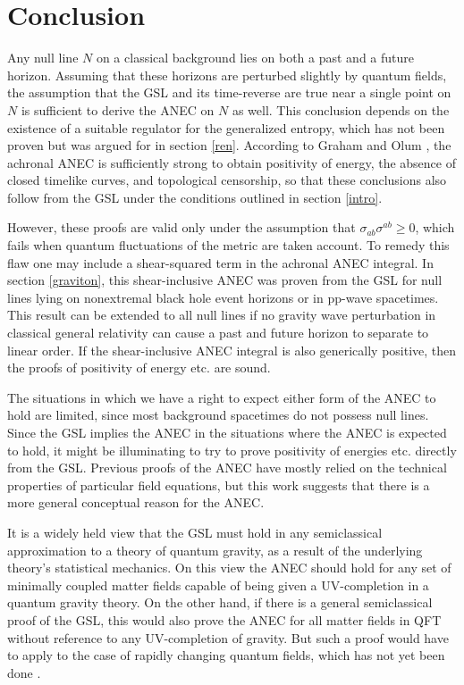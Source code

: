 \documentclass{article}
\begin{document}
\section{Conclusion}\label{con}

Any null line $N$ on a classical background lies on both a past and a future horizon.  Assuming that these horizons are perturbed slightly by quantum fields, the assumption that the GSL and its time-reverse are true near a single point on $N$ is sufficient to derive the ANEC on $N$ as well.  This conclusion depends on the existence of a suitable regulator for the generalized entropy, which has not been proven but was argued for in section \ref{ren}.  According to Graham and Olum \cite{GO07}, the achronal ANEC is sufficiently strong to obtain positivity of energy, the absence of closed timelike curves, and topological censorship, so that these conclusions also follow from the GSL under the conditions outlined in section \ref{intro}. 

However, these proofs are valid only under the assumption that $\sigma_{ab}\sigma^{ab} \ge 0$, which fails when quantum fluctuations of the metric are taken account.  To remedy this flaw one may include a shear-squared term in the achronal ANEC integral.  In section \ref{graviton}, this shear-inclusive ANEC was proven from the GSL for null lines lying on nonextremal black hole event horizons or in pp-wave spacetimes.  This result can be extended to all null lines if no gravity wave perturbation in classical general relativity can cause a past and future horizon to separate to linear order.  If the shear-inclusive ANEC integral is also generically positive, then the proofs of positivity of energy etc. are sound.

The situations in which we have a right to expect either form of the ANEC to hold are limited, since most background spacetimes do not possess null lines.  Since the GSL implies the ANEC in the situations where the ANEC is expected to hold, it might be illuminating to try to prove positivity of energies etc. directly from the GSL.  Previous proofs of the ANEC have mostly relied on the technical properties of particular field equations, but this work suggests that there is a more general conceptual reason for the ANEC.

It is a widely held view that the GSL must hold in any semiclassical approximation to a theory of quantum gravity, as a result of the underlying theory's statistical mechanics.  On this view the ANEC should hold for any set of minimally coupled matter fields capable of being given a UV-completion in a quantum gravity theory.  On the other hand, if there is a general semiclassical proof of the GSL, this would also prove the ANEC for all matter fields in QFT without reference to any UV-completion of gravity.  But such a proof would have to apply to the case of rapidly changing quantum fields, which has not yet been done \cite{10proofs}.
\end{document}
